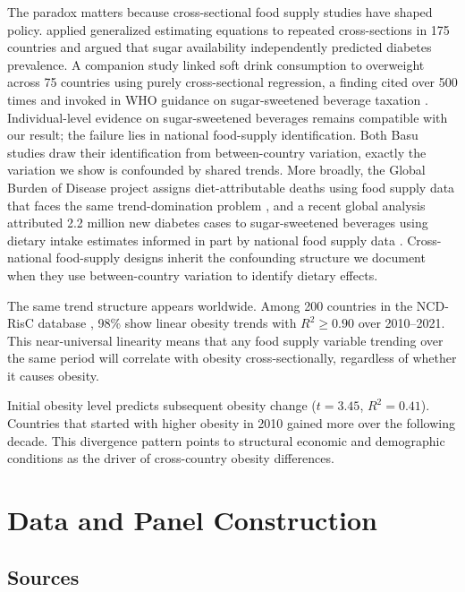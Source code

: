 \documentclass[letterpaper,11pt,leqno]{article}
\begin{document}
The paradox matters because cross-sectional food supply studies have shaped policy. \citet{basu2013} applied generalized estimating equations to repeated cross-sections in 175 countries and argued that sugar availability independently predicted diabetes prevalence. A companion study \citep{basu2013ajph} linked soft drink consumption to overweight across 75 countries using purely cross-sectional regression, a finding cited over 500 times and invoked in WHO guidance on sugar-sweetened beverage taxation \citep{who2023ssb}. Individual-level evidence on sugar-sweetened beverages remains compatible with our result; the failure lies in national food-supply identification. Both Basu studies draw their identification from between-country variation, exactly the variation we show is confounded by shared trends. More broadly, the Global Burden of Disease project assigns diet-attributable deaths using food supply data that faces the same trend-domination problem \citep{gbd2019}, and a recent global analysis attributed 2.2 million new diabetes cases to sugar-sweetened beverages using dietary intake estimates informed in part by national food supply data \citep{laracastor2025}. Cross-national food-supply designs inherit the confounding structure we document when they use between-country variation to identify dietary effects.

The same trend structure appears worldwide. Among 200 countries in the NCD-RisC database \citep{ncdrisc2024bmi}, 98\% show linear obesity trends with $R^2 \geq 0.90$ over 2010--2021. This near-universal linearity means that any food supply variable trending over the same period will correlate with obesity cross-sectionally, regardless of whether it causes obesity.

Initial obesity level predicts subsequent obesity change ($t = 3.45$, $R^2 = 0.41$). Countries that started with higher obesity in 2010 gained more over the following decade. This divergence pattern points to structural economic and demographic conditions as the driver of cross-country obesity differences.

\section{Data and Panel Construction}

\subsection{Sources}
\end{document}
